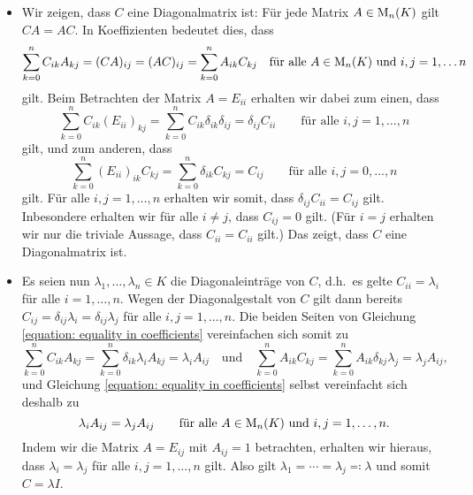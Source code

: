 \begin{itemize}
  \item
    Wir zeigen, dass $C$ eine Diagonalmatrix ist:
    Für jede Matrix $A \in \operatorname{M}_{n}(K)$ gilt $CA = AC$.
    In Koeffizienten bedeutet dies, dass
    \begin{equation}
      \label{equation: equality in coefficients}
        \sum_{k=0}^n C_{ik} A_{kj}
      = (CA)_{ij}
      = (AC)_{ij}
      = \sum_{k=0}^n A_{ik} C_{kj}
      \quad
      \text{für alle $A \in \operatorname{M}_{n}(K)$ und $i,j = 1, \dotsc n$}
    \end{equation}
    gilt.
    Beim Betrachten der Matrix $A  = E_{ii}$ erhalten wir dabei zum einen, dass
    \[
        \sum_{k=0}^n C_{ik} (E_{ii})_{kj}
      = \sum_{k=0}^n C_{ik} \delta_{ik} \delta_{ij}
      = \delta_{ij} C_{ii}
      \qquad
      \text{für alle $i, j = 1, \dotsc, n$}
    \]
    gilt, und zum anderen, dass
    \[
          \sum_{k=0}^n (E_{ii})_{ik} C_{kj}
        = \sum_{k=0}^n \delta_{ik} C_{kj}
        = C_{ij}
        \qquad
        \text{für alle $i, j = 0, \dotsc, n$}
    \]
    gilt.
    Für alle $i, j = 1, \dotsc, n$ erhalten wir somit, dass $\delta_{ij} C_{ii} = C_{ij}$ gilt.
    Inbesondere erhalten wir für alle $i \neq j$, dass $C_{ij} = 0$ gilt.
    (Für $i = j$ erhalten wir nur die triviale Aussage, dass $C_{ii} = C_{ii}$ gilt.)
    Das zeigt, dass $C$ eine Diagonalmatrix ist.
    
  \item
    Es seien nun $\lambda_1, \dotsc, \lambda_n \in K$ die Diagonaleinträge von $C$, d.h.\ es gelte $C_{ii} = \lambda_i$ für alle $i = 1, \dotsc, n$.
    Wegen der Diagonalgestalt von $C$ gilt dann bereits $C_{ij} = \delta_{ij} \lambda_i = \delta_{ij} \lambda_j$ für alle $i, j = 1, \dotsc, n$.
    Die beiden Seiten von Gleichung \eqref{equation: equality in coefficients} vereinfachen sich somit zu
    \[
        \sum_{k=0}^n C_{ik} A_{kj}
      = \sum_{k=0}^n \delta_{ik} \lambda_i A_{kj}
      = \lambda_i A_{ij}
      \quad\text{und}\quad
        \sum_{k=0}^n A_{ik} C_{kj}
      = \sum_{k=0}^n A_{ik} \delta_{kj} \lambda_j
      = \lambda_j A_{ij},
    \]
    und Gleichung \eqref{equation: equality in coefficients} selbst vereinfacht sich deshalb zu
    \[
        \lambda_i A_{ij}
      = \lambda_j A_{ij}
      \qquad
      \text{für alle $A \in \operatorname{M}_{n}(K)$ und $i, j = 1, \dotsc, n$}.
    \]
    Indem wir die Matrix $A = E_{ij}$ mit $A_{ij} = 1$ betrachten, erhalten wir hieraus, dass $\lambda_i = \lambda_j$ für alle $i,j = 1, \dotsc, n$ gilt.
    Also gilt $\lambda_1 = \dotsb = \lambda_j \eqqcolon \lambda$ und somit $C = \lambda I$.
\end{itemize}



